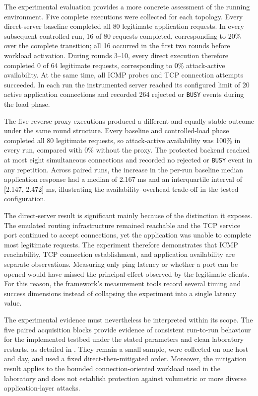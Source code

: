 The experimental evaluation provides a more concrete assessment of the running
environment. Five complete executions were collected for each topology. Every
direct-server baseline completed all 80 legitimate application requests. In
every subsequent controlled run, 16 of 80 requests completed, corresponding to
20\% over the complete transition; all 16 occurred in the first two rounds
before workload activation. During rounds 3--10, every direct execution
therefore completed 0 of 64 legitimate requests, corresponding to 0\%
attack-active availability. At the same time, all ICMP probes and TCP
connection attempts succeeded. In each run the instrumented server reached its
configured limit of 20 active application connections and recorded 264 rejected
or \texttt{BUSY} events during the load phase.

The five reverse-proxy executions produced a different and equally stable
outcome under the same round structure. Every baseline and controlled-load
phase completed all 80 legitimate requests, so attack-active availability was
100\% in every run, compared with 0\% without the proxy. The protected backend
reached at most eight simultaneous connections and recorded no rejected or
\texttt{BUSY} event in any repetition. Across paired runs, the increase in the
per-run baseline median application response had a median of 2.167 ms and an
interquartile interval of [2.147, 2.472] ms, illustrating the
availability--overhead trade-off in the tested configuration.

The direct-server result is significant mainly because of the distinction it exposes.
The emulated routing infrastructure remained reachable and the TCP service port
continued to accept connections, yet the application was unable to complete
most legitimate requests. The experiment therefore demonstrates that ICMP
reachability, TCP connection establishment, and application availability are
separate observations. Measuring only ping latency or whether a port can be
opened would have missed the principal effect observed by the legitimate
clients. For this reason, the framework's measurement tools record several
timing and success dimensions instead of collapsing the experiment into a
single latency value.

The experimental evidence must nevertheless be interpreted within its scope.
The five paired acquisition blocks provide evidence of consistent run-to-run
behaviour for the implemented testbed under the stated parameters and clean
laboratory restarts, as detailed in . They
remain a small sample, were collected on one host and day, and used a fixed
direct-then-mitigated order. Moreover, the mitigation result applies to the
bounded connection-oriented workload used in the laboratory and does not
establish protection against volumetric or more diverse application-layer
attacks.

